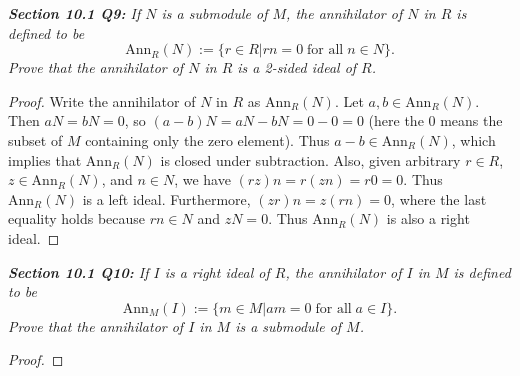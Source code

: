 \documentclass{article}
\begin{document}
\it \textbf{Section 10.1 Q9:} If $N$ is a submodule of $M$, the annihilator
  of $N$ in $R$ is defined to be
  \[\text{Ann}_R(N):= \{r\in R|rn=0\; \text{for all}\; n\in N\}.\]
  Prove that the annihilator of $N$ in $R$ is a 2-sided ideal of $R$.

  \begin{proof}
    Write the annihilator of $N$ in $R$ as $\text{Ann}_R(N)$. Let
    $a,b\in\text{Ann}_R(N)$. Then $aN=bN=0$, so $(a-b)N=aN-bN=0-0=0$ (here
    the 0 means the subset of $M$ containing only the zero element). Thus
    $a-b\in\text{Ann}_R(N)$, which implies that $\text{Ann}_R(N)$ is closed
    under subtraction. Also, given arbitrary $r\in R$,
    $z\in\text{Ann}_R(N)$, and $n\in N$, we have $(rz)n=r(zn)=r0=0$. Thus
    $\text{Ann}_R(N)$ is a left ideal. Furthermore, $(zr)n=z(rn)=0$, where
    the last equality holds because $rn\in N$ and $zN=0$. Thus
    $\text{Ann}_R(N)$ is also a right ideal.
  \end{proof}

\it \textbf{Section 10.1 Q10:} If $I$ is a right ideal of $R$, the
  annihilator of $I$ in $M$ is defined to be
  \[\text{Ann}_M(I):= \{m\in M|am=0\; \text{for all}\; a\in I\}.\]
  Prove that the annihilator of $I$ in $M$ is a submodule of $M$.

  \begin{proof}
  \end{proof}
\end{document}

